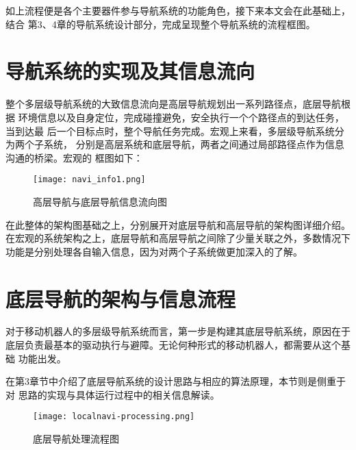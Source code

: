 如上流程便是各个主要器件参与导航系统的功能角色，接下来本文会在此基础上，结合
第3、4章的导航系统设计部分，完成呈现整个导航系统的流程框图。

\section{导航系统的实现及其信息流向}

整个多层级导航系统的大致信息流向是高层导航规划出一系列路径点，底层导航根据
环境信息以及自身定位，完成碰撞避免，安全执行一个个路径点的到达任务，当到达最
后一个目标点时，整个导航任务完成。宏观上来看，多层级导航系统分为两个子系统，
分别是高层系统和底层导航，两者之间通过局部路径点作为信息沟通的桥梁。宏观的
框图如下：

\begin{figure}[ht]
    \centering
    \texttt{[image: navi\_info1.png]}
    \caption{高层导航与底层导航信息流向图}
\end{figure}

在此整体的架构图基础之上，分别展开对底层导航和高层导航的架构图详细介绍。
在宏观的系统架构之上，底层导航和高层导航之间除了少量关联之外，多数情况下
功能是分别处理各自输入信息，因为对两个子系统做更加深入的了解。

\section{底层导航的架构与信息流程}
对于移动机器人的多层级导航系统而言，第一步是构建其底层导航系统，原因在于
底层负责最基本的驱动执行与避障。无论何种形式的移动机器人，都需要从这个基础
功能出发。

在第3章节中介绍了底层导航系统的设计思路与相应的算法原理，本节则是侧重于对
思路的实现与具体运行过程中的相关信息解读。

\begin{figure}[ht]
    \centering
    \texttt{[image: localnavi-processing.png]}
    \caption{底层导航处理流程图}
\end{figure}

